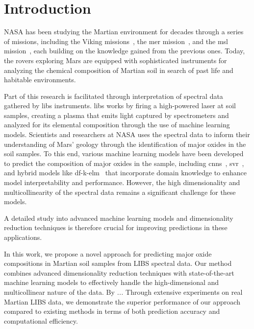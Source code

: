 \section{Introduction}\label{sec:introduction}

NASA has been studying the Martian environment for decades through a series of missions, including the Viking missions~\cite{marsnasagov_vikings}, the \gls{mer} mission~\cite{marsnasagov_observer, marsnasagov_spirit_opportunity}, and the \gls{msl} mission~\cite{marsnasagov_msl}, each building on the knowledge gained from the previous ones.
Today, the rovers exploring Mars are equipped with sophisticated instruments for analyzing the chemical composition of Martian soil in search of past life and habitable environments.

Part of this research is facilitated through interpretation of spectral data gathered  by \gls{libs} instruments.
\gls{libs} works by firing a high-powered laser at soil samples, creating a plasma that emits light captured by spectrometers and analyzed for its elemental composition through the use of machine learning models.
Scientists and researchers at NASA uses the spectral data to inform their understanding of Mars' geology through the identification of major oxides in the soil samples.
To this end, various machine learning models have been developed to predict the composition of major oxides in the sample, including \glspl{cnn}~\cite{yang_laser-induced_2022, yangConvolutionalNeuralNetwork2022}, \gls{svr}~\cite{rezaei_dimensionality_reduction}, and hybrid models like \gls{df}-\gls{k-elm}~\cite{song_DF-K-ELM} that incorporate domain knowledge to enhance model interpretability and performance.
However, the high dimensionality and multicollinearity of the spectral data remains a significant challenge for these models.

A detailed study into advanced machine learning models and dimensionality reduction techniques is therefore crucial for improving predictions in these applications.

In this work, we propose a novel approach for predicting major oxide compositions in Martian soil samples from LIBS spectral data. Our method combines advanced dimensionality reduction techniques with state-of-the-art machine learning models to effectively handle the high-dimensional and multicollinear nature of the data. 
By \textit{...}
Through extensive experiments on real Martian LIBS data, we demonstrate the superior performance of our approach compared to existing methods in terms of both prediction accuracy and computational efficiency.



